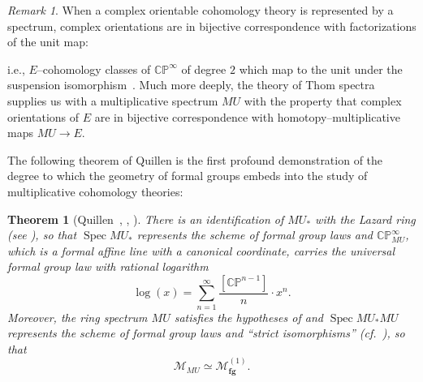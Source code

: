 \documentclass{amsart}
\renewcommand{\S}{\mathbb S}
\newcommand{\C}{\mathbb{C}}
\newcommand{\CP}{\C\P}
\renewcommand{\P}{\mathbb{P}}
\newcommand{\<}{\langle}
\renewcommand{\>}{\rangle}
\newcommand{\Susp}{\Sigma}
\newcommand{\moduli}[1]{\mathcal{M}_{\mathbf{#1}}}
\DeclareMathOperator{\Spec}{Spec}
\theoremstyle{plain}
\newtheorem*{theorem}{Theorem}
\theoremstyle{definition}
\theoremstyle{remark}
\newtheorem*{remark}{Remark}
\begin{document}
\begin{remark}
When a complex orientable cohomology theory is represented by a spectrum, complex orientations are in bijective correspondence with factorizations of the unit map:
\begin{center}
\end{center}
i.e., $E$--cohomology classes of $\CP^\infty$ of degree $2$ which map to the unit under the suspension isomorphism~\cite[Lemma I.4.6]{AdamsBlueBook}.  Much more deeply, the theory of Thom spectra supplies us with a multiplicative spectrum $MU$ with the property that complex orientations of $E$ are in bijective correspondence with homotopy--multiplicative maps $MU \to E$.
\end{remark}

The following theorem of Quillen is the first profound demonstration of the degree to which the geometry of formal groups embeds into the study of multiplicative cohomology theories:

\begin{theorem}[{Quillen~\cite[Theorem 6.5]{QuillenElementaryProofs}, \cite{QuillenFGLsForMSOandMU}, \cite[Appendix 1]{Novikov}}]\label{QuillensTheorem}
There is an identification of $MU_*$ with the Lazard ring (see ), so that $\Spec MU_*$ represents the scheme of formal group laws and $\CP^\infty_{MU}$, which is a formal affine line with a canonical coordinate, carries the universal formal group law with rational logarithm \[\log(x) = \sum_{n=1}^\infty \frac{[\CP^{n-1}]}{n} \cdot x^n.\]  Moreover, the ring spectrum $MU$ satisfies the hypotheses of  and $\Spec MU_* MU$ represents the scheme of formal group laws and ``strict isomorphisms'' (cf.\ ), so that \[\mathcal{M}_{MU} \simeq \moduli{fg}^{(1)}.\]
\end{theorem}
\end{document}
